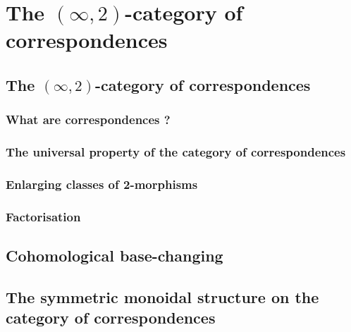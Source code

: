 \chapter{The \texorpdfstring{$(\infty, 2)$}{}-category of correspondences}
    \begin{abstract}
        
    \end{abstract}
    
    \minitoc

    \section{The \texorpdfstring{$(\infty, 2)$}{}-category of correspondences}
        \subsection{What are correspondences ?}
        
        \subsection{The universal property of the category of correspondences}
        
        \subsection{Enlarging classes of 2-morphisms}
        
        \subsection{Factorisation}
        
    \section{Cohomological base-changing} \label{section: cohomological_base_change}
        
    \section{The symmetric monoidal structure on the category of correspondences}